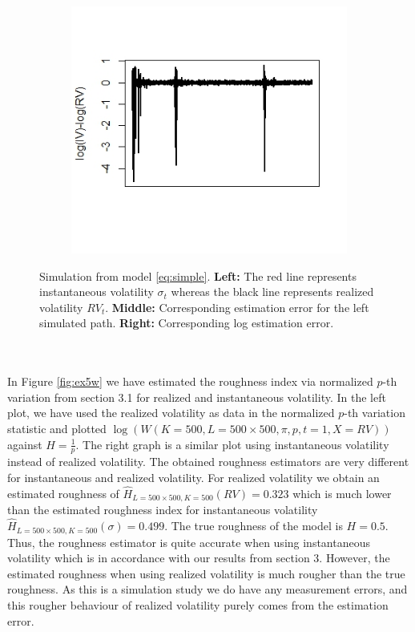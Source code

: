 \documentclass{article}
\begin{document}
\begin{figure}[h]
\begin{subfigure}{0.32\textwidth}
    \end{subfigure}\hfill
    \begin{subfigure}{0.32\textwidth}
        \centering
        \includegraphics[width=\textwidth]{ex5_IVRV3.jpeg}
    \end{subfigure}
    \caption{Simulation from model \eqref{eq:simple}. \textbf{Left:} The red line represents instantaneous volatility $\sigma_t$ whereas the black line represents realized volatility $RV_t$. \textbf{Middle:} Corresponding estimation error for the left simulated path. \textbf{Right:} Corresponding log estimation error.}
    \label{fig:ex5IVRV}
\end{figure}\\\\
In Figure \ref{fig:ex5w} we have estimated the roughness index via normalized $p$-th variation from section 3.1 for realized and instantaneous volatility. In the left plot, we have used the realized volatility as data in the normalized $p$-th variation statistic and plotted $\log(W(K=500, L= 500\times 500, \pi, p, t=1, X = RV))$ against $H=\frac{1}{p}$. The right graph is a similar plot using instantaneous volatility instead of realized volatility. The obtained roughness estimators are very different for instantaneous and realized volatility. For realized volatility we obtain an estimated roughness of $\hat{H}_{L=500\times 500, K=500}(RV)=0.323$ which is much lower than the estimated roughness index for instantaneous volatility $\hat{H}_{L=500\times 500, K=500}(\sigma)=0.499$. The true roughness of the model is $H=0.5$. Thus, the roughness estimator is quite accurate when using instantaneous volatility which is in accordance with our results from section 3. However, the estimated roughness when using realized volatility is much rougher than the true roughness. As this is a simulation study we do have any measurement errors, and this rougher behaviour of realized volatility purely comes from the estimation error.
\end{document}

